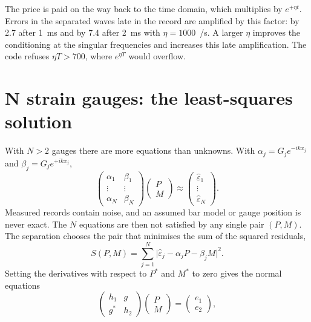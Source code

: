 \documentclass[11pt,a4paper,numbers=noenddot,abstract=true]{scrartcl}
\begin{document}
The price is paid on the way back to the time domain, which multiplies by $e^{+\eta t}$. Errors in the separated
waves late in the record are amplified by this factor: by 2.7 after 1~ms and by 7.4 after 2~ms with
$\eta = 1000$~/s. A larger $\eta$ improves the conditioning at the singular frequencies and increases this late
amplification. The code refuses $\eta T > 700$, where $e^{\eta T}$ would overflow.

\section{N strain gauges: the least-squares solution}
\label{sec:ngauges}

With $N > 2$ gauges there are more equations than unknowns. With $\alpha_j = G_j e^{-ikx_j}$ and
$\beta_j = G_j e^{+ikx_j}$,
\begin{equation}
  \begin{pmatrix} \alpha_1 & \beta_1 \\ \vdots & \vdots \\ \alpha_N & \beta_N \end{pmatrix}
  \begin{pmatrix} P \\ M \end{pmatrix}
  \approx
  \begin{pmatrix} \hat\varepsilon_1 \\ \vdots \\ \hat\varepsilon_N \end{pmatrix}.
\end{equation}
Measured records contain noise, and an assumed bar model or gauge position is never exact. The $N$ equations are
then not satisfied by any single pair $(P, M)$. The separation chooses the pair that minimises the sum of the
squared residuals,
\begin{equation}
  S(P, M) = \sum_{j=1}^{N} \bigl|\hat\varepsilon_j - \alpha_j P - \beta_j M\bigr|^2.
  \label{eq:lsq}
\end{equation}
Setting the derivatives with respect to $P^*$ and $M^*$ to zero gives the normal equations
\begin{equation}
  \begin{pmatrix} h_1 & g \\ g^* & h_2 \end{pmatrix}
  \begin{pmatrix} P \\ M \end{pmatrix}
  =
  \begin{pmatrix} e_1 \\ e_2 \end{pmatrix},
  \label{eq:normal}
\end{equation}
\end{document}
